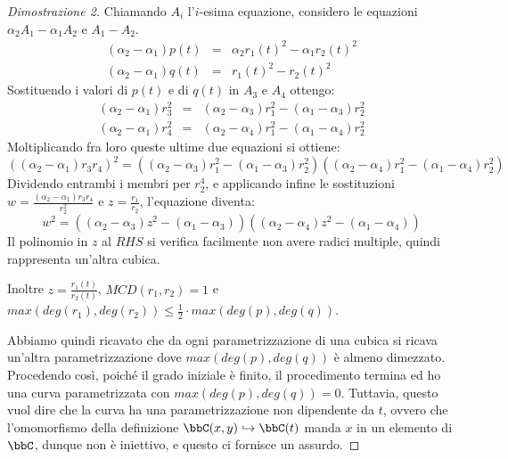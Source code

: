 \begin{proof}[Dimostrazione 2]
Chiamando $A_i$ l'$i$-esima equazione, considero le equazioni $\alpha_2A_1-\alpha_1A_2$ e $A_1-A_2$.
\begin{eqnarray*}
  (\alpha_2-\alpha_1)p(t) &=& \alpha_2r_1(t)^2-\alpha_1r_2(t)^2 \\
  (\alpha_2-\alpha_1)q(t) &=& r_1(t)^2-r_2(t)^2
\end{eqnarray*}
Sostituendo i valori di $p(t)$ e di $q(t)$ in $A_3$ e $A_4$ ottengo:
\begin{eqnarray*}
  (\alpha_2-\alpha_1)r_3^2 &=& (\alpha_2-\alpha_3)r_1^2-(\alpha_1-\alpha_3)r_2^2 \\
  (\alpha_2-\alpha_1)r_4^2 &=& (\alpha_2-\alpha_4)r_1^2-(\alpha_1-\alpha_4)r_2^2
\end{eqnarray*}
Moltiplicando fra loro queste ultime due equazioni si ottiene:
\begin{equation*}
  ((\alpha_2-\alpha_1)r_3r_4)^2 = ((\alpha_2-\alpha_3)r_1^2-(\alpha_1-\alpha_3)r_2^2)((\alpha_2-\alpha_4)r_1^2-(\alpha_1-\alpha_4)r_2^2)
\end{equation*}
Dividendo entrambi i membri per $r_2^4$, e applicando infine le sostituzioni $w=\frac{(\alpha_2-\alpha_1)r_3r_4}{r_2^2}$ e $z=\frac{r_1}{r_2}$, l'equazione diventa:
$$w^2=((\alpha_2-\alpha_3)z^2-(\alpha_1-\alpha_3))((\alpha_2-\alpha_4)z^2-(\alpha_1-\alpha_4))$$
Il polinomio in $z$ al $RHS$ si verifica facilmente non avere radici multiple, quindi rappresenta un'altra cubica.

Inoltre $z=\frac{r_1(t)}{r_2(t)}$, $MCD(r_1,r_2)=1$ e $max(deg(r_1), deg(r_2))\leq\frac{1}{2}\cdot max(deg(p),deg(q))$.

Abbiamo quindi ricavato che da ogni parametrizzazione di una cubica si ricava un'altra parametrizzazione dove $max(deg(p),deg(q))$ è almeno dimezzato.
Procedendo così, poiché il grado iniziale è finito, il procedimento termina ed ho una curva parametrizzata con $max(deg(p),deg(q))=0$. 
Tuttavia, questo vuol dire che la curva ha una parametrizzazione non dipendente da $t$, ovvero che l'omomorfismo della definizione $\bbC(x,y)\hookrightarrow\bbC(t)$ manda $x$ in un elemento di $\bbC$, dunque non è iniettivo, e questo ci fornisce un assurdo.
\end{proof}
